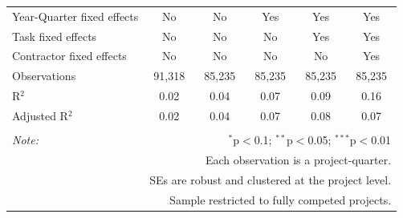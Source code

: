 \documentclass[
]{article}
\begin{document}
\begin{table}[H]
\begin{tabular}{@{\extracolsep{-2pt}}lccccc}
Year-Quarter fixed effects & No & No & Yes & Yes & Yes \\ 
Task fixed effects & No & No & No & Yes & Yes \\ 
Contractor fixed effects & No & No & No & No & Yes \\ 
Observations & 91,318 & 85,235 & 85,235 & 85,235 & 85,235 \\ 
R$^{2}$ & 0.02 & 0.04 & 0.07 & 0.09 & 0.16 \\ 
Adjusted R$^{2}$ & 0.02 & 0.04 & 0.07 & 0.08 & 0.07 \\ 
\hline 
\hline \\[-1.8ex] 
\textit{Note:}  & \multicolumn{5}{r}{$^{*}$p$<$0.1; $^{**}$p$<$0.05; $^{***}$p$<$0.01} \\ 
 & \multicolumn{5}{r}{Each observation is a project-quarter.} \\ 
 & \multicolumn{5}{r}{SEs are robust and clustered at the project level.} \\ 
 & \multicolumn{5}{r}{Sample restricted to fully competed projects.} \\ 
\end{tabular} 
\end{table}
\end{document}
